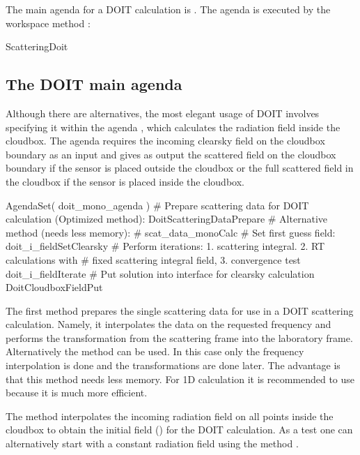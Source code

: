 The main agenda for a DOIT calculation is
. 
The agenda is executed by the workspace method
:
\begin{code}
ScatteringDoit
\end{code}

\subsection{The DOIT main agenda}
\label{sec:scattering:doit_main_agenda}

Although there are alternatives, the most elegant usage of DOIT involves
specifying it within the agenda , which calculates
the radiation field inside the cloudbox.
The agenda requires the incoming
clearsky field on the cloudbox boundary as an input and gives as
output the scattered field on the cloudbox boundary if the sensor is
placed outside the cloudbox or the full scattered field in the
cloudbox if the sensor is placed inside the cloudbox.
\begin{code}
AgendaSet( doit_mono_agenda ){
 # Prepare scattering data for DOIT calculation (Optimized method):
   DoitScatteringDataPrepare
 # Alternative method (needs less memory):
 # scat_data_monoCalc
 # Set first guess field:		
   doit_i_fieldSetClearsky
 # Perform iterations: 1. scattering integral. 2. RT calculations with 
 #   fixed scattering integral field, 3. convergence test 
   doit_i_fieldIterate
 # Put solution into interface for clearsky calculation   
   DoitCloudboxFieldPut
 }		
\end{code}
The first method  prepares the single
scattering data for use in a DOIT scattering calculation. Namely, it
interpolates the data on the requested
frequency and performs the transformation from the scattering
frame into the laboratory frame. Alternatively the method
 can be used. In this case only the
frequency interpolation is done and the transformations are done
later. The advantage is that this method needs less memory. For 1D
calculation it is recommended to use
 because it is much more
efficient. 

The method  interpolates the
incoming radiation field on all points inside the cloudbox to obtain
the initial field () for the DOIT calculation. 
As a test one can alternatively start with a constant radiation field
using the method . 

